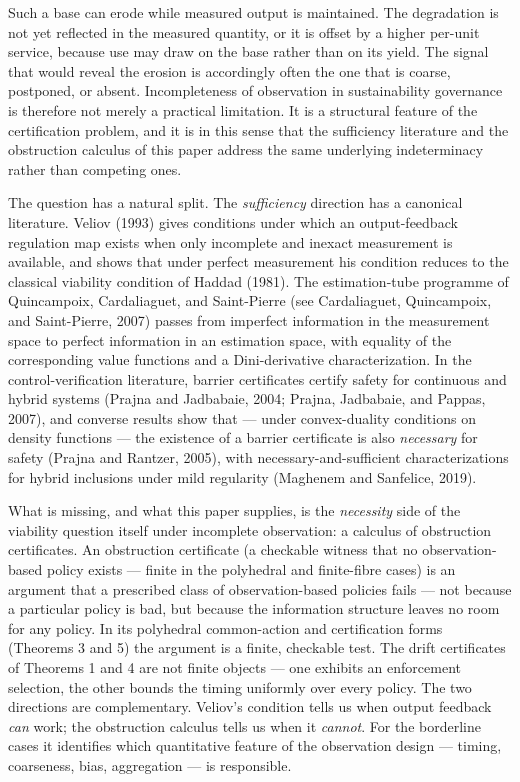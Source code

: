 \documentclass[11pt]{article}
\begin{document}
Such a base can erode while measured output is maintained. The
degradation is not yet reflected in the measured quantity, or it is
offset by a higher per-unit service, because use may draw on the base
rather than on its yield. The signal that would reveal the erosion is
accordingly often the one that is coarse, postponed, or absent.
Incompleteness of observation in sustainability governance is therefore
not merely a practical limitation. It is a structural feature of the
certification problem, and it is in this sense that the sufficiency
literature and the obstruction calculus of this paper address the same underlying indeterminacy rather than competing ones.

The question has a natural split. The \emph{sufficiency} direction has a
canonical literature. Veliov (1993) gives conditions under which an
output-feedback regulation map exists when only incomplete and inexact
measurement is available, and shows that under perfect measurement his
condition reduces to the classical viability condition of Haddad (1981).
The estimation-tube programme of Quincampoix, Cardaliaguet, and
Saint-Pierre (see Cardaliaguet, Quincampoix, and Saint-Pierre, 2007)
passes from imperfect information in the measurement space to perfect
information in an estimation space, with equality of the corresponding
value functions and a Dini-derivative characterization. In the
control-verification literature, barrier certificates certify safety for
continuous and hybrid systems (Prajna and Jadbabaie, 2004; Prajna,
Jadbabaie, and Pappas, 2007), and converse results show that --- under
convex-duality conditions on density functions --- the existence of a
barrier certificate is also \emph{necessary} for safety (Prajna and
Rantzer, 2005), with necessary-and-sufficient characterizations for
hybrid inclusions under mild regularity (Maghenem and Sanfelice, 2019).

What is missing, and what this paper supplies, is the \emph{necessity}
side of the viability question itself under incomplete observation: a
calculus of obstruction certificates. An obstruction certificate (a
checkable witness that no observation-based policy exists --- finite in
the polyhedral and finite-fibre cases) is an argument that a prescribed
class of observation-based policies fails --- not because a particular
policy is bad, but because the information structure leaves no room for
any policy. In its polyhedral common-action and certification forms
(Theorems 3 and 5) the argument is a finite, checkable test. The drift
certificates of Theorems 1 and 4 are not finite objects --- one exhibits
an enforcement selection, the other bounds the timing uniformly over every policy. The two directions are
complementary. Veliov's condition tells us when output feedback
\emph{can} work; the obstruction calculus tells us when it
\emph{cannot}. For the borderline cases it identifies which quantitative
feature of the observation design --- timing, coarseness, bias,
aggregation --- is responsible.
\end{document}

